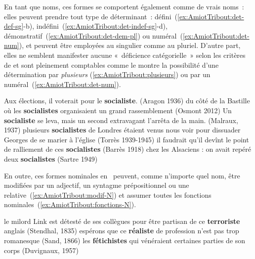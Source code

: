 \documentclass[output=paper]{LSP/langsci}
\begin{document}
En tant que noms, ces formes se comportent également comme de vrais noms~: elles peuvent prendre tout type de déterminant~: défini~(\ref{ex:AmiotTribout:det-def-sg}-b), \mbox{indéfini~(\ref{ex:AmiotTribout:det-indef-sg}-d)}, démonstratif~(\ref{ex:AmiotTribout:det-dem-pl}) ou numéral~(\ref{ex:AmiotTribout:det-num}), et peuvent être employées au singulier comme au pluriel. D'autre part, elles  ne semblent manifester aucune «~déficience catégorielle~» selon les critères de \citep{lauwers14c} et sont pleinement comptables comme le montre la possibilité d'une détermination par \textit{plusieurs} (\ref{ex:AmiotTribout:plusieurs}) ou par un numéral~(\ref{ex:AmiotTribout:det-num}).


\begin{exe}
\ex \label{ex:AmiotTribout:det}
\begin{xlist}
\ex \label{ex:AmiotTribout:det-def-sg} Aux élections, il voterait pour le \textbf{socialiste}. (Aragon 1936)
\ex \label{ex:AmiotTribout:det-def-pl} du côté de la Bastille où les \textbf{socialistes} organisaient un grand rassemblement (Osmont 2012)
\ex \label{ex:AmiotTribout:det-indef-sg} Un \textbf{socialiste} se leva, mais un second extravagant l'arrêta de la main. (Malraux, 1937)
\sloppy
\ex \label{ex:AmiotTribout:plusieurs} plusieurs \textbf{socialistes} de Londres étaient venus nous voir pour dissuader Georges de se marier à l'église (Torrès 1939-1945)
\fussy
\ex \label{ex:AmiotTribout:det-dem-pl} il faudrait qu'il devînt le point de ralliement de ces \textbf{socialistes} (Barrès 1918)
\ex \label{ex:AmiotTribout:det-num} chez les Alsaciens : on avait repéré deux \textbf{socialistes} (Sartre 1949)
\end{xlist}
\end{exe}


En outre, ces formes nominales en \iste\ peuvent, comme n'importe quel nom, être modifiées par un adjectif, un syntagme prépositionnel ou une relative~(\ref{ex:AmiotTribout:modif-N}) et assumer toutes les fonctions nominales~(\ref{ex:AmiotTribout:fonctions-N}).

\begin{exe}
\ex \label{ex:AmiotTribout:modif-N}
\begin{xlist}
\ex le milord Link est détesté de ses collègues pour être partisan de ce \textbf{terroriste} anglais %
(Stendhal, 1835)
\ex  espérons que ce \textbf{réaliste} de profession n'est pas trop romanesque (Sand, 1866)
\ex  les \textbf{fétichistes} qui vénéraient certaines parties de son corps (Duvignaux, 1957)
\end{xlist}
\end{exe}
\end{document}
